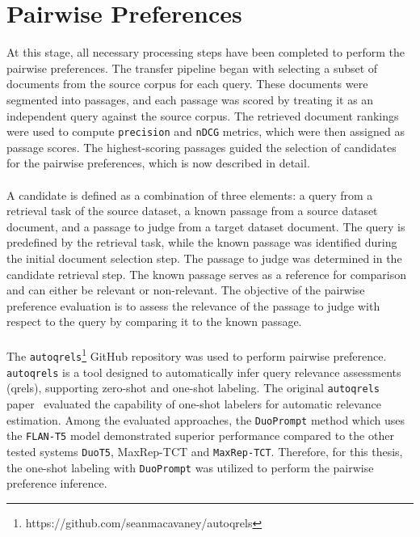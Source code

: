 \section{Pairwise Preferences}\label{pairwise-transfering-relevance-labels-across-datasets}

At this stage, all necessary processing steps have been completed to perform the pairwise preferences. The transfer pipeline began with selecting a subset of documents from the source corpus for each query. These documents were segmented into passages, and each passage was scored by treating it as an independent query against the source corpus. The retrieved document rankings were used to compute \texttt{precision} and \texttt{nDCG} metrics, which were then assigned as passage scores. The highest-scoring passages guided the selection of candidates for the pairwise preferences, which is now described in detail.
\\\\
A candidate is defined as a combination of three elements: a query from a retrieval task of the source dataset, a known passage from a source dataset document, and a passage to judge from a target dataset document. The query is predefined by the retrieval task, while the known passage was identified during the initial document selection step. The passage to judge was determined in the candidate retrieval step. The known passage serves as a reference for comparison and can either be relevant or non-relevant. The objective of the pairwise preference evaluation is to assess the relevance of the passage to judge with respect to the query by comparing it to the known passage.
\\\\
The \texttt{autoqrels}\footnote{https://github.com/seanmacavaney/autoqrels} GitHub repository was used to perform pairwise preference. \texttt{autoqrels} is a tool designed to automatically infer query relevance assessments (qrels), supporting zero-shot and one-shot labeling. The original \texttt{autoqrels} paper~\citep{macavaney:2023} evaluated the capability of one-shot labelers for automatic relevance estimation. Among the evaluated approaches, the \texttt{DuoPrompt} method which uses the \texttt{FLAN-T5} model demonstrated superior performance compared to the other tested systems \texttt{DuoT5}, {MaxRep-TCT} and \texttt{MaxRep-TCT}. Therefore, for this thesis, the one-shot labeling with \texttt{DuoPrompt} was utilized to perform the pairwise preference inference.
